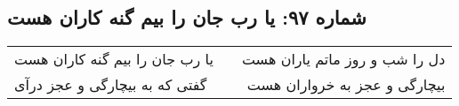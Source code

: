 \begin{center}
\section*{شماره ۹۷: یا رب جان را بیم گنه کاران هست}
\label{sec:097}
\begin{longtable}{l p{0.5cm} r}
یا رب جان را بیم گنه کاران هست
&&
دل را شب و روز ماتم یاران هست
\\
گفتی که به بیچارگی و عجز درآی
&&
بیچارگی و عجز به خرواران هست
\\
\end{longtable}
\end{center}
